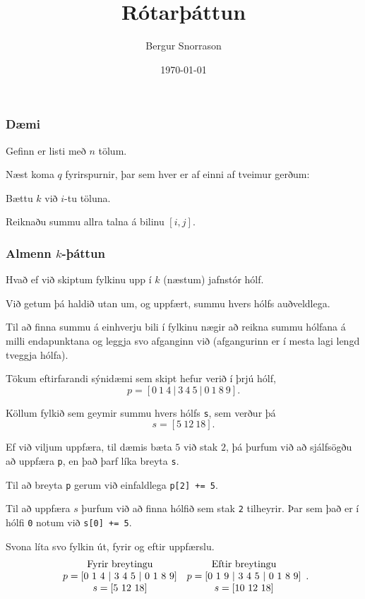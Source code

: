 \title{Rótarþáttun}
\author{Bergur Snorrason}
\date{\today}



\frame{\titlepage}

{
	\frametitle{Dæmi}
	{
		\item<1-> Gefinn er listi með $n$ tölum.
		\item<2-> Næst koma $q$ fyrirspurnir, þar sem hver er af einni af tveimur gerðum:
		{
			\item<3-> Bættu $k$ við $i$-tu töluna.
			\item<4-> Reiknaðu summu allra talna á bilinu $[i, j]$.
		}
	}
}

{
	\frametitle{Almenn $k$-þáttun}
	{
		\item<1-> Hvað ef við skiptum fylkinu upp í $k$ (næstum) jafnstór hólf.
		\item<2-> Við getum þá haldið utan um, og uppfært, summu hvers hólfs auðveldlega.
		\item<3-> Til að finna summu á einhverju bili í fylkinu nægir að reikna summu hólfana á milli
			endapunktana og leggja svo afganginn við (afgangurinn er í mesta lagi lengd tveggja hólfa).
		\item<4-> Tökum eftirfarandi sýnidæmi sem skipt hefur verið í þrjú hólf,
			\[
				p = [0\ 1\ 4\ |\ 3\ 4\ 5\ |\ 0\ 1\ 8\ 9].
			\]
		\item<5-> Köllum fylkið sem geymir summu hvers hólfs \texttt{s}, sem verður þá
			\[
				s = [5\ 12\ 18].
			\]
	}
}

{
	{
		\item<1-> Ef við viljum uppfæra, til dæmis bæta $5$ við stak $2$, þá þurfum við að sjálfsögðu að uppfæra
			\texttt{p}, en það þarf líka breyta \texttt{s}.
		\item<2-> Til að breyta \texttt{p} gerum við einfaldlega \texttt{p[2] += 5}.
		\item<3-> Til að uppfæra $s$ þurfum við að finna hólfið sem stak \texttt{2} tilheyrir. Þar sem það er í hólfi \texttt{0}
			notum við \texttt{s[0] += 5}.
		\item<4-> Svona líta svo fylkin út, fyrir og eftir uppfærslu.
			\[
			\begin {array}{c c}
			\text{Fyrir breytingu} & \text{Eftir breytingu}\\
				p = [0\ 1\ 4\ |\ 3\ 4\ 5\ |\ 0\ 1\ 8\ 9] & p = [0\ 1\ 9\ |\ 3\ 4\ 5\ |\ 0\ 1\ 8\ 9]\\
				s = [5\ 12\ 18] & s = [10\ 12\ 18]
			\end {array}.
			\]
	}
}

